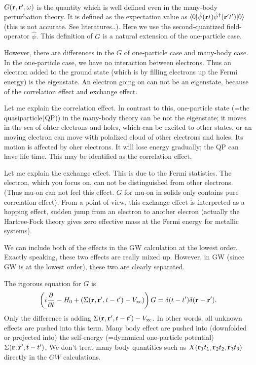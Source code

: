\documentclass[a4paper,10pt,epsf,fleqn]{article}
\newcommand{\bfr}{{\bf r}}
\begin{document}
\\
$G(\bfr,\bfr',\omega)$ is the quantity which is well defined
even in the many-body perturbation theory. It is defined
as the expectation value as 
$\langle 0|\hat{\psi}(\bfr t) \hat{\psi}^\dagger(\bfr' t')| 0 \rangle$
(this is not accurate. See literatures..). Here we use
the second-quantized field-operator $\hat{\psi}$. This definition
of $G$ is a natural extension of the one-particle case.

However, there are differences in the $G$ of one-particle
case and many-body case. 
In the one-particle case, we have no interaction between electrons.
Thus an electron added to the ground state (which is by filling electrons up the Fermi energy) is the eigenstate. 
An electron going on can not be an eigenstate,
because of the correlation effect and exchange effect.

Let me explain the correlation effect.
In contrast to this, one-particle state 
(=the quasiparticle(QP))
in the many-body theory can be not the eigenstate; 
it moves in the sea of ohter electrons and holes, which can be excited to other states, or an moving electron can move with polalized cloud of other electrons and holes.  Its motion is affected by oher electrons. It will lose
energy gradually; the QP can have life time.
This may be identified as the correlation effect.

Let me explain the exchange effect.
This is due to the Fermi statistics.
The electron, which you focus on, can not be distinguished from other electrons. (Thus mu-on can not feel this effect.
$G$ for mu-on in solids only contains pure correlation effect). 
From a point of view, this exchange effect is interpreted as 
a hopping effect, sudden jump from an electron to another elecron
(actually the Hartree-Fock theory gives zero effective mass at the Fermi energy for metallic systems).

We can include both of the effects in the GW calculation at the lowest
order. Exactly speaking, these two effects are really mixed up. However,
in GW (since GW is at the lowest order), these two are clearly separated.


The rigorous equation for $G$ is
\begin{eqnarray}
\left(i \frac{\partial }{\partial t} - H_0 + 
(\Sigma(\bfr,\bfr',t-t')-V_{\rm xc})\right) G
= \delta(t-t')\delta(\bfr-\bfr'). \label{gdef}
\end{eqnarray}
Only the difference is adding 
$\Sigma(\bfr,\bfr',t-t')-V_{\rm xc}$.
In other words, all unknown effects are pushed into this term.
Many body effect are pushed into (downfolded or projected into) 
the self-energy (=dynamical one-particle potential)
$\Sigma(\bfr,\bfr',t-t')$. 
We don't treat many-body quantities such as
$X(\bfr_1 t_1, \bfr_2 t_2, \bfr_3 t_3)$ directly in the $GW$
calculations.
\end{document}
